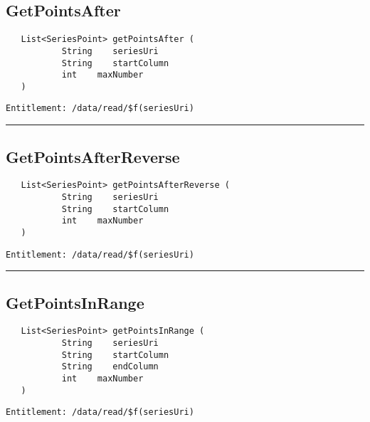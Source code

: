 \subsection{GetPointsAfter}
\label{Api:GetPointsAfter}
\begin{Verbatim}
   List<SeriesPoint> getPointsAfter (
           String    seriesUri
           String    startColumn
           int    maxNumber
   )
\end{Verbatim}
\begin{Verbatim}[formatcom=\color{Maroon}]
  Entitlement: /data/read/$f(seriesUri)
\end{Verbatim}



\rule{12cm}{2pt}
\subsection{GetPointsAfterReverse}
\label{Api:GetPointsAfterReverse}
\begin{Verbatim}
   List<SeriesPoint> getPointsAfterReverse (
           String    seriesUri
           String    startColumn
           int    maxNumber
   )
\end{Verbatim}
\begin{Verbatim}[formatcom=\color{Maroon}]
  Entitlement: /data/read/$f(seriesUri)
\end{Verbatim}



\rule{12cm}{2pt}
\subsection{GetPointsInRange}
\label{Api:GetPointsInRange}
\begin{Verbatim}
   List<SeriesPoint> getPointsInRange (
           String    seriesUri
           String    startColumn
           String    endColumn
           int    maxNumber
   )
\end{Verbatim}
\begin{Verbatim}[formatcom=\color{Maroon}]
  Entitlement: /data/read/$f(seriesUri)
\end{Verbatim}



